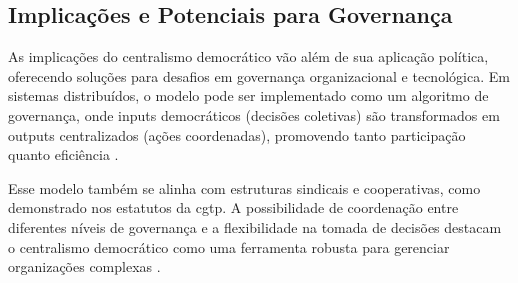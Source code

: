 \subsection{Implicações e Potenciais para Governança}
\label{sec:implicacoes_potenciais}

As implicações do centralismo democrático vão além de sua aplicação
política, oferecendo soluções para desafios em governança organizacional e
tecnológica. Em sistemas distribuídos, o modelo pode ser implementado como
um algoritmo de governança, onde inputs democráticos (decisões coletivas)
são transformados em outputs centralizados (ações coordenadas), promovendo
tanto participação quanto eficiência \cite{DoArtifactsHavePolitics}.

Esse modelo também se alinha com estruturas sindicais e cooperativas, como
demonstrado nos estatutos da \gls{cgtp}. A possibilidade de coordenação entre
diferentes níveis de governança e a flexibilidade na tomada de decisões
destacam o centralismo democrático como uma ferramenta robusta para
gerenciar organizações complexas \cite{CGTPStatutes}.
